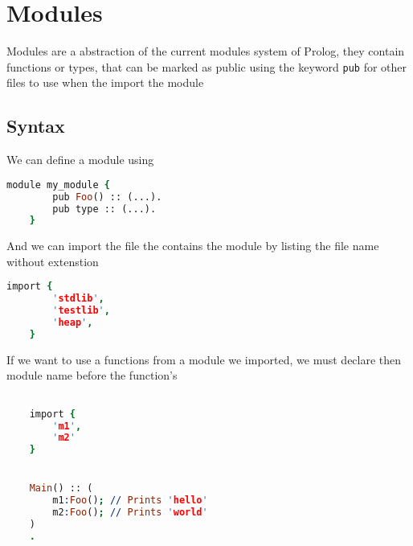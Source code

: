 \section{Modules}

Modules are a abstraction of the current modules system of Prolog, they contain
functions or types, that can be marked as public using the keyword \texttt{pub}
for other files to use when the import the module

\subsection{Syntax}

We can define a module using
\begin{lstlisting}[language =Prolog]
    module my_module {
        pub Foo() :: (...).
        pub type :: (...).
    }
\end{lstlisting}

And we can import the file the contains the module by listing the file name
without extenstion

\begin{lstlisting}[language =Prolog]
    import {
        'stdlib',
        'testlib',
        'heap',
    }
\end{lstlisting}

If we want to use a functions from a module we imported, we must declare 
then module name before the function's


\begin{lstlisting}[language =Prolog]

    import {
        'm1', 
        'm2' 
    }


    Main() :: (
        m1:Foo(); // Prints 'hello'
        m2:Foo(); // Prints 'world'
    )
    .

\end{lstlisting}





